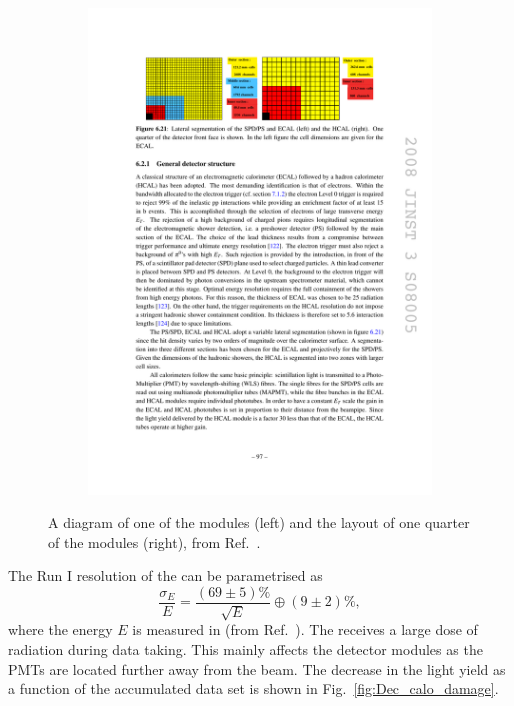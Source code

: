 \begin{figure}[!h]
\begin{subfigure}[m]{0.4\textwidth}
        \includegraphics[width=1.0\textwidth]{figs/Detector/hcal_layout.pdf}
    \end{subfigure}
    \caption{A diagram of one of the \hcal modules (left) and the layout of one quarter of the \hcal modules (right), from Ref.~\cite{Alves:2008zz}.}
    \label{fig:Dec_hcal_layout}   
\end{figure}


The Run I resolution of the \hcal can be parametrised as 
\begin{equation}
\frac{\sigma_{E}}{E} = \frac{(69\pm5)\%}{\sqrt{E}} \oplus (9\pm2)\%,
\end{equation}
where the energy $E$ is measured in \gev (from Ref.~\cite{1748-0221-12-07-C07024}).
The \hcal receives a large dose of radiation during data taking. This mainly affects the detector modules as the PMTs are located further away from the beam. The decrease in the light yield as a function of the accumulated data set is shown in Fig.~\ref{fig:Dec_calo_damage}.


